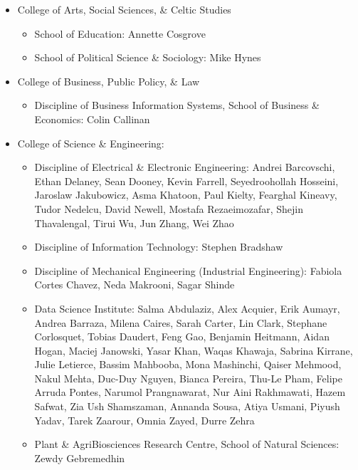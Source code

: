 \documentclass[10pt,a4paper]{res} %
\begin{document}
\begin{resume}
\begin{itemize} \itemsep -2pt
\item College of Arts, Social Sciences, \& Celtic Studies
\begin{itemize}
\item School of Education: Annette Cosgrove
\item School of Political Science \& Sociology: Mike Hynes
\end{itemize}
\item College of Business, Public Policy, \& Law
\begin{itemize}
\item Discipline of Business Information Systems, School of Business \& Economics: Colin Callinan
\end{itemize}
\item College of Science \& Engineering:
\begin{itemize}
\item Discipline of Electrical \& Electronic Engineering: Andrei Barcovschi, Ethan Delaney, Sean Dooney, Kevin Farrell, Seyedroohollah Hosseini, Jaroslaw Jakubowicz, Asma Khatoon, Paul Kielty, Fearghal Kineavy, Tudor Nedelcu, David Newell, Mostafa Rezaeimozafar, Shejin Thavalengal, Tirui Wu, Jun Zhang, Wei Zhao
\item Discipline of Information Technology: Stephen Bradshaw
\item Discipline of Mechanical Engineering (Industrial Engineering): Fabiola Cortes Chavez, Neda Makrooni, Sagar Shinde
\item Data Science Institute: Salma Abdulaziz, Alex Acquier, Erik Aumayr, Andrea Barraza, Milena Caires, Sarah Carter, Lin Clark, Stephane Corlosquet, Tobias Daudert, Feng Gao, Benjamin Heitmann, Aidan Hogan, Maciej Janowski, Yasar Khan, Waqas Khawaja, Sabrina Kirrane, Julie Letierce, Bassim Mahbooba, Mona Mashinchi, Qaiser Mehmood, Nakul Mehta, Duc-Duy Nguyen, Bianca Pereira, Thu-Le Pham, Felipe Arruda Pontes, Narumol Prangnawarat, Nur Aini Rakhmawati, Hazem Safwat, Zia Ush Shamszaman, Annanda Sousa, Atiya Usmani, Piyush Yadav, Tarek Zaarour, Omnia Zayed, Durre Zehra
\item Plant \& AgriBiosciences Research Centre, School of Natural Sciences: Zewdy Gebremedhin
\end{itemize}
\end{itemize}


\vspace{0.2in} %


\end{resume}
\end{document}
